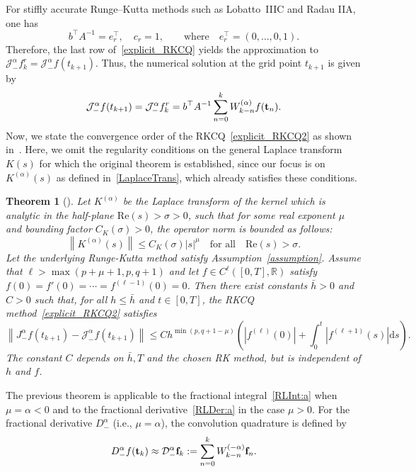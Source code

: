 \documentclass[a4paper,10pt,reqno]{amsart}
\newtheorem{theorem}{Theorem}[section]
\theoremstyle{definition}
\newcommand{\R}{\mathbb{R}}      %
\newcommand{\dd}{\mathrm{d}}
\begin{document}
For stiffly accurate Runge–Kutta methods such as Lobatto~IIIC and Radau IIA, one has 
$$b^\top A^{-1}=e_r^\top,\quad c_r=1,\qquad \text{where}\quad  e_r^\top=(0,\ldots,0,1).$$
Therefore, the last row of~\eqref{explicit_RKCQ} yields the approximation to $\mathcal{J}_{-}^{\alpha}f_k^r=\mathcal{J}_{-}^{\alpha}f(t_{k+1})$. Thus, the numerical solution at the grid point $t_{k+1}$ is given by
 \begin{equation}\label{explicit_RKCQ2}
\mathcal{J}_{-}^{\alpha}f(t_{k+1})=\mathcal{J}_{-}^{\alpha}f_k^r=b^\top A^{-1}\sum_{n=0}^{k}W_{k-n}^{(\alpha)}f({\bf t}_n).
 \end{equation}
Now, we state the  convergence order of the RKCQ~\eqref{explicit_RKCQ2} as shown in~\cite[Theorem 3]{BaLuMar}. Here, we omit the regularity conditions on the general Laplace transform $K(s)$ for which the original theorem is established, since our focus is on $K^{(\alpha)}(s)$ as defined in~\eqref{LaplaceTrans}, which already satisfies these conditions.  
\begin{theorem}[\cite{BaLuMar}]\label{thm:RKCQ_convergence}
Let $K^{(\alpha)}$ be the Laplace transform  of the kernel which  is analytic in the half-plane $\mathrm{Re} (s) > \sigma > 0$, such that for
some real exponent $\mu$ and bounding factor $C_K(\sigma)> 0$, the operator norm is bounded as follows:
\begin{equation}\label{eq:hyperbolic_symbol}
    \left\|K^{(\alpha)}(s)\right\|\leq C_K(\sigma) |s|^\mu\quad \text{for all}\quad \mathrm{Re} (s)>\sigma.
\end{equation}
Let the underlying Runge-Kutta method satisfy Assumption~\ref{assumption}. Assume that   $\ell> \max(p+\mu+1,p,q+1)$ and let $f\in C^\ell([0,T],\R)$ satisfy $f(0)=f'(0)=\cdots=f^{(\ell-1)}(0)=0$. Then there exist constants $\bar h>0$ and $C>0$ such that, for all $h\le \bar h$ and $t\in[0,T]$, the RKCQ method~\eqref{explicit_RKCQ2}  satisfies
\begin{equation}\label{RK_error_bound}
\left\|J^{\alpha}_{-}f(t_{k+1})-\mathcal{J}_{-}^{\alpha}f(t_{k+1})\right\|\leq C h^{\min(p,q+1-\mu)}\left(\left|f^{(\ell)}(0)\right|+\int_0^t\left|f^{(\ell+1)}(s)\right|\dd s\right).
\end{equation}
The constant $C$ depends on $\bar h,T$ and the  chosen  RK method, but is independent of $h$ and $f$.
\end{theorem}

The previous theorem is applicable  to the fractional integral~\eqref{RLInt:a} when $\mu=\alpha<0$ and to the fractional derivative~\eqref{RLDer:a} in the case $\mu>0$. For the fractional derivative $D_{-}^{\alpha}$ (i.e., $\mu=\alpha$), the convolution quadrature is defined by
\begin{equation}\label{RKConQua2}
D_{-}^{\alpha}f(\mathbf t_k)\approx\mathcal{D}_{-}^{\alpha}\mathbf f_k:=\sum_{n=0}^{k}W_{k-n}^{(-\alpha)}{\bf f}_{n}.
\end{equation}
\end{document}

